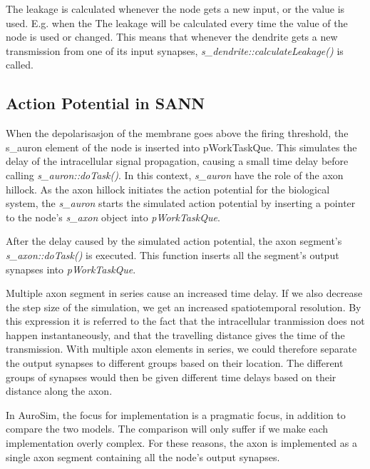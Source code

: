 	The leakage is calculated whenever the node gets a new input, or the value is used.
	E.g. when the 
	The leakage will be calculated every time the value of the node is used or changed.
	This means that whenever the dendrite gets a new transmission from one of its input synapses, \emph{s\_dendrite::calculateLeakage()} is called.








	\subsection{Action Potential in SANN}
	\label{ssecSANNAP}
	When the depolarisasjon of the membrane goes above the firing threshold, the s\_auron element of the node is inserted into pWorkTaskQue.
	This simulates the delay of the intracellular signal propagation, causing a small time delay before calling \emph{s\_auron::doTask()}.
	In this context, \emph{s\_auron} have the role of the axon hillock.
	As the axon hillock initiates the action potential for the biological system, the \emph{s\_auron} starts the simulated action potential by inserting a pointer to the node's \emph{s\_axon} object into \emph{pWorkTaskQue}.

	After the delay caused by the simulated action potential, the axon segment's \emph{s\_axon::doTask()} is executed.
	This function inserts all the segment's output synapses into \emph{pWorkTaskQue}.

	Multiple axon segment in series cause an increased time delay.
	If we also decrease the step size of the simulation, we get an increased spatiotemporal resolution.
	By this expression it is referred to the fact that the intracellular tranmission does not happen instantaneously, and that the travelling distance gives the time of the transmission.
	With multiple axon elements in series, we could therefore separate the output synapses to different groups based on their location.
	The different groups of synapses would then be given different time delays based on their distance along the axon.

	In AuroSim, the focus for implementation is a pragmatic focus, in addition to compare the two models. 
	The comparison will only suffer if we make each implementation overly complex.
	For these reasons, the axon is implemented as a single axon segment containing all the node's output synapses.

